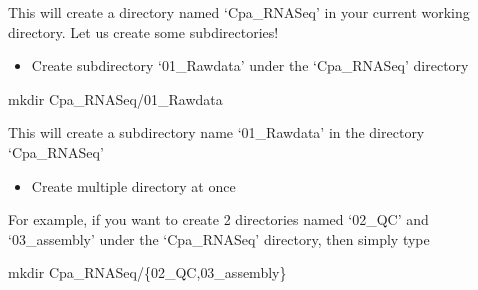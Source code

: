 \documentclass[
  letterpaper,
  DIV=11,
  numbers=noendperiod]{scrreprt}
\newenvironment{Shaded}{\begin{snugshade}}{\end{snugshade}}
\newcommand{\DataTypeTok}[1]{\textcolor[rgb]{0.68,0.00,0.00}{#1}}
\newcommand{\FunctionTok}[1]{\textcolor[rgb]{0.28,0.35,0.67}{#1}}
\newcommand{\NormalTok}[1]{\textcolor[rgb]{0.00,0.23,0.31}{#1}}
\newcommand{\OperatorTok}[1]{\textcolor[rgb]{0.37,0.37,0.37}{#1}}
\providecommand{\tightlist}{%
  \setlength{\itemsep}{0pt}\setlength{\parskip}{0pt}}\usepackage{longtable,booktabs,array}
\begin{document}
This will create a directory named `Cpa\_RNASeq' in your current working
directory. Let us create some subdirectories!

\begin{itemize}
\tightlist
\item
  Create subdirectory `01\_Rawdata' under the `Cpa\_RNASeq' directory
\end{itemize}

\begin{Shaded}
\begin{Highlighting}[]
\FunctionTok{mkdir}\NormalTok{ Cpa\_RNASeq/01\_Rawdata}
\end{Highlighting}
\end{Shaded}

This will create a subdirectory name `01\_Rawdata' in the directory
`Cpa\_RNASeq'

\begin{itemize}
\tightlist
\item
  Create multiple directory at once
\end{itemize}

For example, if you want to create 2 directories named `02\_QC' and
`03\_assembly' under the `Cpa\_RNASeq' directory, then simply type

\begin{Shaded}
\begin{Highlighting}[]
\FunctionTok{mkdir}\NormalTok{ Cpa\_RNASeq/}\DataTypeTok{\{02\_QC}\OperatorTok{,}\DataTypeTok{03\_assembly\}}
\end{Highlighting}
\end{Shaded}
\end{document}
